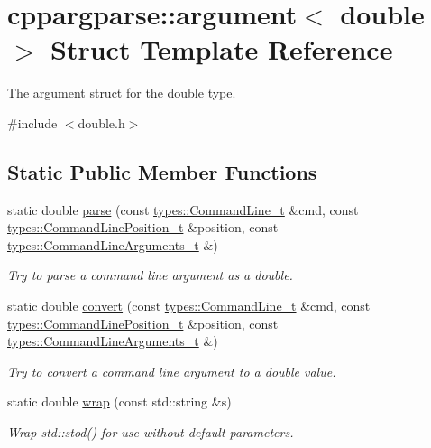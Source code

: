\hypertarget{structcppargparse_1_1argument_3_01double_01_4}{}\section{cppargparse\+:\+:argument$<$ double $>$ Struct Template Reference}
\label{structcppargparse_1_1argument_3_01double_01_4}


The argument struct for the double type.  




{\ttfamily \#include $<$double.\+h$>$}

\subsection*{Static Public Member Functions}
\begin{DoxyCompactItemize}
\item 
static double \hyperlink{structcppargparse_1_1argument_3_01double_01_4_a5c9b85ad2daa03840f04b5f3d598ab99}{parse} (const \hyperlink{types_8h_a80adf2418b7ce9fe616698efa7533ecf}{types\+::\+Command\+Line\+\_\+t} \&cmd, const \hyperlink{types_8h_a43b4f43f8940de1bf09ced6f1b668053}{types\+::\+Command\+Line\+Position\+\_\+t} \&position, const \hyperlink{types_8h_a003c660afe2ee9c6cc39aea966e8926d}{types\+::\+Command\+Line\+Arguments\+\_\+t} \&)
\begin{DoxyCompactList}\small\item\em Try to parse a command line argument as a double. \end{DoxyCompactList}\item 
static double \hyperlink{structcppargparse_1_1argument_3_01double_01_4_a364bb87c111c11c91c1beafc6237dae4}{convert} (const \hyperlink{types_8h_a80adf2418b7ce9fe616698efa7533ecf}{types\+::\+Command\+Line\+\_\+t} \&cmd, const \hyperlink{types_8h_a43b4f43f8940de1bf09ced6f1b668053}{types\+::\+Command\+Line\+Position\+\_\+t} \&position, const \hyperlink{types_8h_a003c660afe2ee9c6cc39aea966e8926d}{types\+::\+Command\+Line\+Arguments\+\_\+t} \&)
\begin{DoxyCompactList}\small\item\em Try to convert a command line argument to a double value. \end{DoxyCompactList}\item 
static double \hyperlink{structcppargparse_1_1argument_3_01double_01_4_ad840410f86ea4c57b6dd4af0c18921b0}{wrap} (const std\+::string \&s)
\begin{DoxyCompactList}\small\item\em Wrap std\+::stod() for use without default parameters. \end{DoxyCompactList}\end{DoxyCompactItemize}


